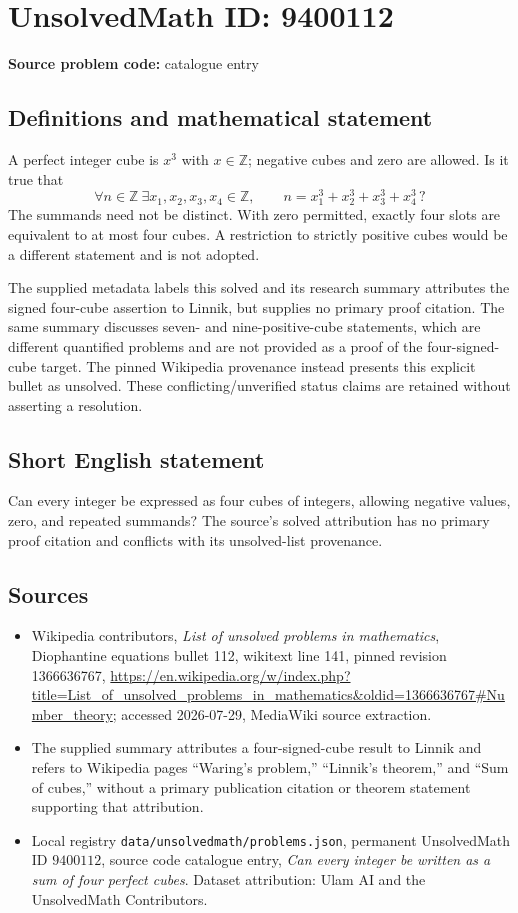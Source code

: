 \documentclass[11pt]{article}
\begin{document}
\section*{UnsolvedMath ID: 9400112}
\textbf{Source problem code:} catalogue entry
\subsection{Definitions and mathematical statement}
A perfect integer cube is $x^3$ with $x\in\mathbb Z$; negative cubes and zero are allowed. Is it true that
\[
\forall n\in\mathbb Z\ \exists x_1,x_2,x_3,x_4\in\mathbb Z,
\qquad n=x_1^3+x_2^3+x_3^3+x_4^3\,?
\]
The summands need not be distinct. With zero permitted, exactly four slots are equivalent to at most four cubes. A restriction to strictly positive cubes would be a different statement and is not adopted.

The supplied metadata labels this solved and its research summary attributes the signed four-cube assertion to Linnik, but supplies no primary proof citation. The same summary discusses seven- and nine-positive-cube statements, which are different quantified problems and are not provided as a proof of the four-signed-cube target. The pinned Wikipedia provenance instead presents this explicit bullet as unsolved. These conflicting/unverified status claims are retained without asserting a resolution.
\subsection{Short English statement}
Can every integer be expressed as four cubes of integers, allowing negative values, zero, and repeated summands? The source's solved attribution has no primary proof citation and conflicts with its unsolved-list provenance.
\subsection{Sources}
\begin{itemize}
\item Wikipedia contributors, \emph{List of unsolved problems in mathematics}, Diophantine equations bullet 112, wikitext line 141, pinned revision 1366636767, \url{https://en.wikipedia.org/w/index.php?title=List_of_unsolved_problems_in_mathematics&oldid=1366636767#Number_theory}; accessed 2026-07-29, MediaWiki source extraction.
\item The supplied summary attributes a four-signed-cube result to Linnik and refers to Wikipedia pages ``Waring's problem,'' ``Linnik's theorem,'' and ``Sum of cubes,'' without a primary publication citation or theorem statement supporting that attribution.
\item Local registry \texttt{data/unsolvedmath/problems.json}, permanent UnsolvedMath ID $9400112$, source code catalogue entry, \emph{Can every integer be written as a sum of four perfect cubes}. Dataset attribution: Ulam AI and the UnsolvedMath Contributors.
\end{itemize}
\end{document}
